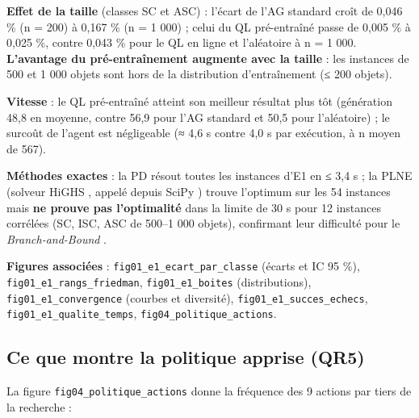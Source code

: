 \documentclass[
  french,
  11pt,
  a4paper,
]{article}
\begin{document}
\textbf{Effet de la taille} (classes SC et ASC) : l'écart de l'AG
standard croît de 0,046 \% (n = 200) à 0,167 \% (n = 1 000) ; celui du
QL pré-entraîné passe de 0,005 \% à 0,025 \%, contre 0,043 \% pour le QL
en ligne et l'aléatoire à n = 1 000. \textbf{L'avantage du
pré-entraînement augmente avec la taille} : les instances de 500 et 1
000 objets sont hors de la distribution d'entraînement (≤ 200 objets).

\textbf{Vitesse} : le QL pré-entraîné atteint son meilleur résultat plus
tôt (génération 48,8 en moyenne, contre 56,9 pour l'AG standard et 50,5
pour l'aléatoire) ; le surcoût de l'agent est négligeable (≈ 4,6 s
contre 4,0 s par exécution, à n moyen de 567).

\textbf{Méthodes exactes} : la PD résout toutes les instances d'E1 en ≤
3,4 s ; la PLNE (solveur HiGHS \autocite{huangfu_hall_2018}, appelé
depuis SciPy \autocite{virtanen_scipy_2020}) trouve l'optimum sur les 54
instances mais \textbf{ne prouve pas l'optimalité} dans la limite de 30
s pour 12 instances corrélées (SC, ISC, ASC de 500--1 000 objets),
confirmant leur difficulté pour le \emph{Branch-and-Bound}
\autocite{pisinger_where_2005,martello_toth_1990}.

\textbf{Figures associées} : \texttt{fig01\_e1\_ecart\_par\_classe}
(écarts et IC 95 \%), \texttt{fig01\_e1\_rangs\_friedman},
\texttt{fig01\_e1\_boites} (distributions),
\texttt{fig01\_e1\_convergence} (courbes et diversité),
\texttt{fig01\_e1\_succes\_echecs}, \texttt{fig01\_e1\_qualite\_temps},
\texttt{fig04\_politique\_actions}.

\subsection{Ce que montre la politique apprise
(QR5)}\label{analyse_resultats-ce-que-montre-la-politique-apprise-qr5}

La figure \texttt{fig04\_politique\_actions} donne la fréquence des 9
actions par tiers de la recherche :
\end{document}

